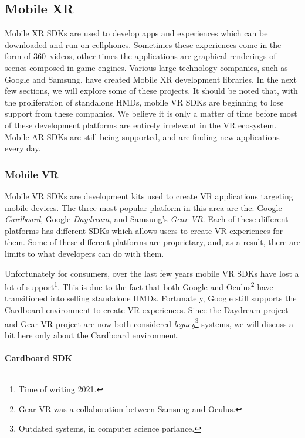 \subsection{Mobile XR}

Mobile XR SDKs are used to develop apps and experiences which can be downloaded and run on cellphones. Sometimes these experiences come in the form of 360\textdegree \ videos, other times the applications are graphical renderings of scenes composed in game engines. Various large technology companies, such as Google and Samsung, have created Mobile XR development libraries. In the next few sections, we will explore some of these projects. It should be noted that, with the proliferation of standalone HMDs, mobile VR SDKs are beginning to lose support from these companies. We believe it is only a matter of time before most of these development platforms are entirely irrelevant in the VR ecosystem. Mobile AR SDKs are still being supported, and are finding new applications every day.

\subsubsection{Mobile VR}

Mobile VR SDKs are development kits used to create VR applications targeting mobile devices. The three most popular platform in this area are the: Google \textit{Cardboard}, Google \textit{Daydream}, and Samsung's \textit{Gear VR}. Each of these different platforms has different SDKs which allows users to create VR experiences for them. Some of these different platforms are proprietary, and, as a result, there are limits to what developers can do with them. 

Unfortunately for consumers, over the last few years mobile VR SDKs have lost a lot of support\footnote{Time of writing 2021.}. This is due to the fact that both Google and Oculus\footnote{Gear VR was a collaboration between Samsung and Oculus.} have transitioned into selling standalone HMDs. Fortunately, Google still supports the Cardboard environment to create VR experiences. Since the Daydream project and Gear VR project are now both considered \textit{legacy}\footnote{Outdated systems, in computer science parlance.} systems, we will discuss a bit here only about the Cardboard environment. 

\paragraph{Cardboard SDK}

